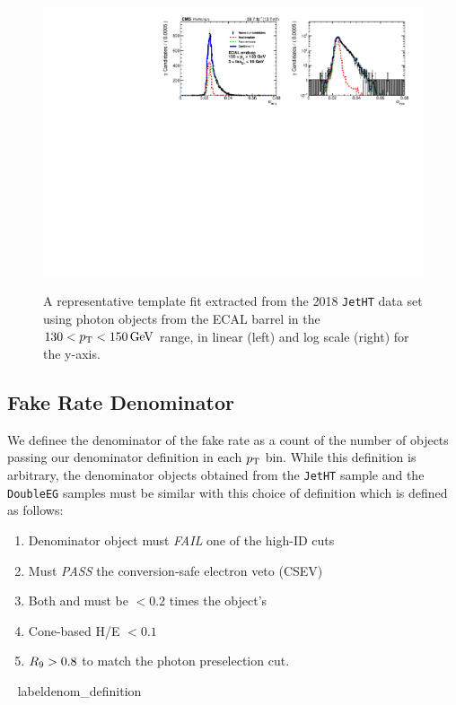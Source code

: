 \begin{figure}[!htbp]
\caption{A representative template fit extracted from the 2018 \texttt{JetHT} data set using photon objects from the ECAL barrel in the $130<p_{\mathrm{T}}<150\,\text{Ge\hspace{-.08em}V}$ range, in linear (left) and log scale (right) for the y-axis.}
\centering
\includegraphics[scale=0.80]{fig/fakeRatePlot_jetht_2018_EE_pT130To150_chIso5To10.pdf}
\label{fig:templatefit}
\end{figure}

\subsection{Fake Rate Denominator}

We definee the denominator of the fake rate as a count of the number of objects passing our denominator definition in each $p_{\mathrm{T}}$ bin. While this definition is arbitrary, the denominator objects obtained from the \texttt{JetHT} sample and the \texttt{DoubleEG} samples must be similar with this choice of definition which is defined as follows:
\begin{enumerate}
    \item Denominator object must \emph{FAIL} one of the high-\pt ID cuts
    \item Must \emph{PASS} the conversion-safe electron veto (CSEV)
    \item Both \chiso and \corphoiso must be $< 0.2$ times the object's \pt
    \item Cone-based H/E $< 0.1$ 
    \item $R_\mathrm{9}>0.8$ to match the photon preselection cut.
\end{enumerate}~ label{denom_definition}

